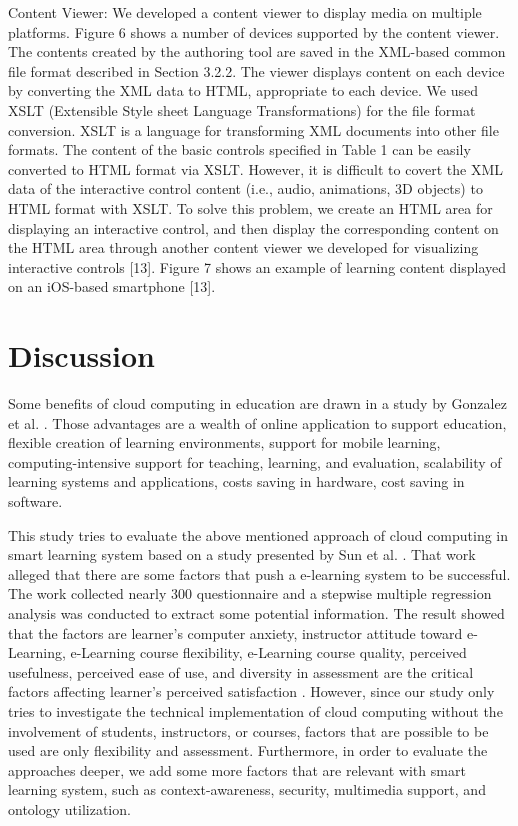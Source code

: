 \documentclass[journal]{vgtc}                %
\begin{document}
  Content Viewer: We developed a content viewer to display media on multiple platforms. Figure 6 shows a number of devices supported by the content viewer. The contents created by the authoring tool are saved in the XML-based common file format described in Section 3.2.2. The viewer displays content on each device by converting the XML data to HTML, appropriate to each device. We used XSLT (Extensible Style sheet Language Transformations) for the file format conversion. XSLT is a language for transforming XML documents into other file formats. The content of the basic controls specified in Table 1 can be easily converted to HTML format via XSLT. However, it is difficult to covert the XML data of the interactive control content (i.e., audio, animations, 3D objects) to HTML format with XSLT. To solve this problem, we create an HTML area for displaying an interactive control, and then display the corresponding content on the HTML area through another content viewer we developed for visualizing interactive controls [13]. Figure 7 shows an example of learning content displayed on an iOS-based smartphone [13].

\section{Discussion}
Some benefits of cloud computing in education are drawn in a study by Gonzalez et al. \cite{Gonzalez-Martinez2014}. Those advantages are a wealth of online application to support education, flexible creation of learning environments, support for mobile learning, computing-intensive support for teaching, learning, and evaluation, scalability of learning systems and applications, costs saving in hardware, cost saving in software.

This study tries to evaluate the above mentioned approach of cloud computing in smart learning system based on a study presented by Sun et al. \cite{Sun2008}. That work alleged that there are some factors that push a e-learning system to be successful. The work collected nearly 300 questionnaire and a stepwise multiple regression analysis was conducted to extract some potential information. The result showed that the factors are learner's computer anxiety, instructor attitude toward e-Learning, e-Learning course flexibility, e-Learning course quality, perceived usefulness, perceived ease of use, and diversity in assessment are the critical factors affecting learner's perceived satisfaction \cite{Sun2008}. However, since our study only tries to investigate the technical implementation of cloud computing without the involvement of students, instructors, or courses, factors that are possible to be used are only flexibility and assessment. Furthermore, in order to evaluate the approaches deeper, we add some more factors that are relevant with smart learning system, such as context-awareness, security, multimedia support, and ontology utilization.
\end{document}
